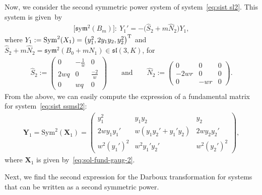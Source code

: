 \documentclass[10pt,a4paper]{amsart}
\numberwithin{equation}{section}
\def\Sym{\mathrm{Sym}}
\def\sym{\mathfrak{s}\mathrm{y}\mathfrak{m}}
\begin{document}
Now, we consider the second symmetric power system of system~\eqref{eq:sist sl2}. This system is given~by
\begin{gather}\label{eq:sist ssmsl2}
\big[\sym^2 (B_m)\big]\colon \ Y_1'=-\big(\widehat{S}_2 + m \widehat{N}_2\big) Y_1 ,
\end{gather}
where $Y_1:= \Sym^2 ( X_1) = \big( y_1^2, 2y_1y_2 , y_2^2 \big)^{\rm T}$ and $\widehat{S}_2 + m \widehat{N}_2 =\sym^2 (B_0 +mN_1) \in \mathfrak{sl} (3,K)$, for
\begin{gather*}
\widehat{S}_2:=\begin{pmatrix} 	
0&- \frac{1}{w} &0\\ 2 wq&0&
\frac{-2}{w}\\ 0&wq&0
	\end{pmatrix} \qquad \text{and} \qquad
	\widehat{N}_2:=\begin{pmatrix}
	0&0&0\\ -2 wr&0&0
\\ 0&-wr&0
	\end{pmatrix}\!.
\end{gather*}
From the above, we can easily compute the expression of a fundamental matrix for system~\eqref{eq:sist ssmsl2}:
\begin{gather}\label{eq:sol-fund-sl-2}
 \mathbf{Y}_{1} = \Sym^2 ( \mathbf{X}_1) = \begin{pmatrix} y^2_1 & y_1 y_2 & y_2 \\[2pt] 2wy_1 y_1' & w(y_1 y_2' + y_1' y_2) & 2wy_2 y_2' \\[3pt] w^2 (y_1')^2 & w^2 y_1' y_2' & w^2 (y_2')^2 \end{pmatrix}\!,
\end{gather}
where $\mathbf{X}_1$ is given by~\eqref{eq:sol-fund-gaug-2}.

Next, we find the second expression for the Darboux transformation for systems that can be written as a second symmetric power.
\end{document}
